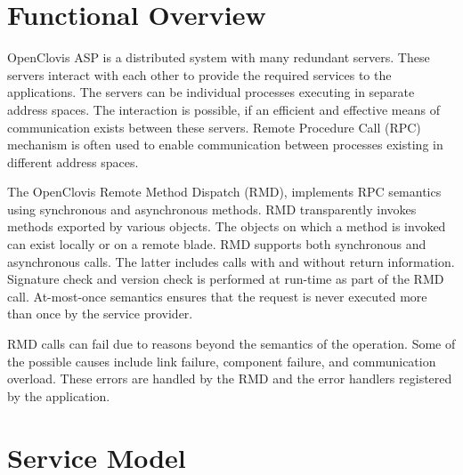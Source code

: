 \hypertarget{group__group26}{
\chapter{Functional Overview}
\label{group__group26}
}

\begin{flushleft}
OpenClovis ASP is a distributed system with many redundant servers. These servers interact with each other to provide the required services to the 
applications. The servers can be individual processes executing in separate address spaces. The interaction is possible, if an efficient and effective 
means of communication exists between these servers. Remote Procedure Call (RPC) mechanism is often used to enable communication between processes 
existing in different address spaces. 
\par
The OpenClovis Remote Method Dispatch (RMD), implements RPC semantics using synchronous and asynchronous methods. RMD transparently 
invokes methods exported by various objects. The objects on which a method is invoked can exist locally or on a remote blade. RMD supports both 
synchronous and asynchronous calls. The latter includes calls with and without return information. Signature check and version check is performed at 
run-time as part of the RMD call. At-most-once semantics ensures that the request is never executed more than once by the service provider. 
\par
RMD calls can fail due to reasons beyond the semantics of the operation. Some of the possible causes include link failure, component failure, and 
communication overload. These errors are handled by the RMD and the error handlers registered by the application.

\chapter{Service Model}

\end{flushleft}
